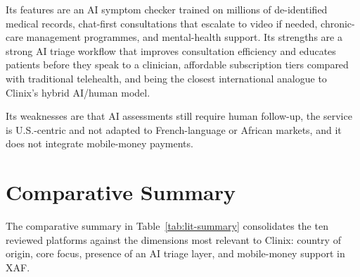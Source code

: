 Its features are an AI symptom checker trained on millions of de-identified medical records, chat-first consultations that escalate to video if needed, chronic-care management programmes, and mental-health support. Its strengths are a strong AI triage workflow that improves consultation efficiency and educates patients before they speak to a clinician, affordable subscription tiers compared with traditional telehealth, and being the closest international analogue to Clinix's hybrid AI/human model.

Its weaknesses are that AI assessments still require human follow-up, the service is U.S.-centric and not adapted to French-language or African markets, and it does not integrate mobile-money payments.

\section{Comparative Summary}

The comparative summary in Table~\ref{tab:lit-summary} consolidates the ten reviewed platforms against the dimensions most relevant to Clinix: country of origin, core focus, presence of an AI triage layer, and mobile-money support in XAF.

